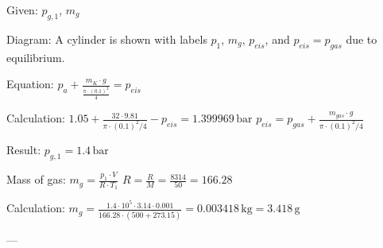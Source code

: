Given: \( p_{g,1} \), \( m_g \)  

Diagram: A cylinder is shown with labels \( p_1 \), \( m_g \), \( p_{eis} \), and \( p_{eis} = p_{gas} \) due to equilibrium.  

Equation:  
\( p_a + \frac{m_K \cdot g}{\frac{\pi \cdot (0.1)^2}{4}} = p_{eis} \)  

Calculation:  
\( 1.05 + \frac{32 \cdot 9.81}{\pi \cdot (0.1)^2 / 4} - p_{eis} = 1.399969 \, \text{bar} \)  
\( p_{eis} = p_{gas} + \frac{m_{gas} \cdot g}{\pi \cdot (0.1)^2 / 4} \)  

Result:  
\( p_{g,1} = 1.4 \, \text{bar} \)  

Mass of gas:  
\( m_g = \frac{p_1 \cdot V}{R \cdot T_1} \)  
\( R = \frac{R}{M} = \frac{8314}{50} = 166.28 \)  

Calculation:  
\( m_g = \frac{1.4 \cdot 10^5 \cdot 3.14 \cdot 0.001}{166.28 \cdot (500 + 273.15)} = 0.003418 \, \text{kg} = 3.418 \, \text{g} \)  

---